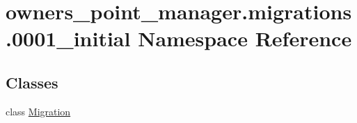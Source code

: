 \hypertarget{namespaceowners__point__manager_1_1migrations_1_10001__initial}{\section{owners\-\_\-point\-\_\-manager.\-migrations.0001\-\_\-initial Namespace Reference}
\label{namespaceowners__point__manager_1_1migrations_1_10001__initial}
}
\subsection*{Classes}
\begin{DoxyCompactItemize}
\item 
class \hyperlink{classowners__point__manager_1_1migrations_1_10001__initial_1_1Migration}{Migration}
\end{DoxyCompactItemize}
